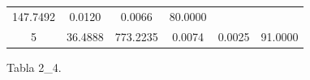 \documentclass[11pt,]{article}
\begin{document}
\begin{longtable}[]{@{}cccccc@{}}
\begin{minipage}[t]{0.25\columnwidth}
147.7492\strut
\end{minipage} & \begin{minipage}[t]{0.11\columnwidth}\centering\strut
0.0120\strut
\end{minipage} & \begin{minipage}[t]{0.14\columnwidth}\centering\strut
0.0066\strut
\end{minipage} & \begin{minipage}[t]{0.13\columnwidth}\centering\strut
80.0000\strut
\end{minipage}\tabularnewline
\begin{minipage}[t]{0.08\columnwidth}\centering\strut
5\strut
\end{minipage} & \begin{minipage}[t]{0.11\columnwidth}\centering\strut
36.4888\strut
\end{minipage} & \begin{minipage}[t]{0.25\columnwidth}\centering\strut
773.2235\strut
\end{minipage} & \begin{minipage}[t]{0.11\columnwidth}\centering\strut
0.0074\strut
\end{minipage} & \begin{minipage}[t]{0.14\columnwidth}\centering\strut
0.0025\strut
\end{minipage} & \begin{minipage}[t]{0.13\columnwidth}\centering\strut
91.0000\strut
\end{minipage}\tabularnewline
\bottomrule
\end{longtable}

Tabla 2\_4.
\end{document}
